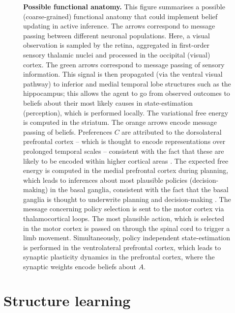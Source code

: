 \documentclass[review,12pt,authoryear]{elsarticle}
\begin{document}
\begin{figure}
\setcounter{figure}{4}
    \caption{\textbf{Possible functional anatomy.} This figure summarises a possible (coarse-grained) functional anatomy that could implement belief updating in active inference. The arrows correspond to message passing between different neuronal populations. Here, a visual observation is sampled by the retina, aggregated in first-order sensory thalamic nuclei and processed in the occipital (visual) cortex. The green arrows correspond to message passing of sensory information. This signal is then propagated (via the ventral visual pathway) to inferior and medial temporal lobe structures such as the hippocampus; this allows the agent to go from observed outcomes to beliefs about their most likely causes in state-estimation (perception), which is performed locally. The variational free energy is computed in the striatum. The orange arrows encode message passing of beliefs. Preferences $C$ are attributed to the dorsolateral prefrontal cortex – which is thought to encode representations over prolonged temporal scales \citep{parrWorkingMemoryAttention2017} – consistent with the fact that these are likely to be encoded within higher cortical areas \citep{fristonActiveInferenceCuriosity2017}. The expected free energy is computed in the medial prefrontal cortex \citep{fristonActiveInferenceProcess2017} during planning, which leads to inferences about most plausible policies (decision-making) in the basal ganglia, consistent with the fact that the basal ganglia is thought to underwrite planning and decision-making \citep{parrAnatomyInferenceGenerative2018,jahanshahiFrontostriatosubthalamicpallidalNetworkGoaldirected2015,bernsHowBasalGanglia1996,dingBasalGangliaContributions2013,haberPrimateBasalGanglia2003,thibautBasalGangliaPlay2016}. The message concerning policy selection is sent to the motor cortex via thalamocortical loops. The most plausible action, which is selected in the motor cortex is passed on through the spinal cord to trigger a limb movement. Simultaneously, policy independent state-estimation is performed in the ventrolateral prefrontal cortex, which leads to synaptic plasticity dynamics in the prefrontal cortex, where the synaptic weights encode beliefs about $A$.}
    \label{fig: brain}
\end{figure}



\section{Structure learning}
\label{sec: structure learning}
\end{document}
